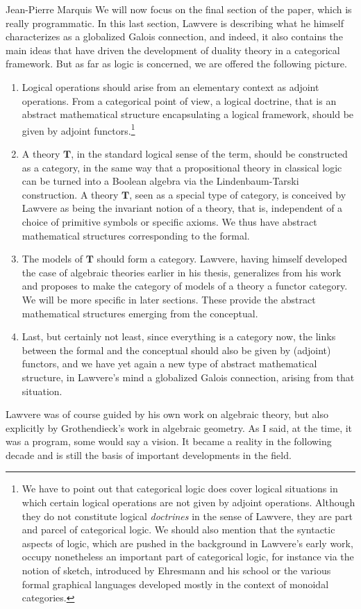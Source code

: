 \begin{artengenv}{Jean-Pierre Marquis}
We will now focus on the final section of the paper, which is really programmatic. In this last section, Lawvere is describing what he himself characterizes as a globalized Galois connection, and indeed, it also contains the main ideas that have driven the development of duality theory in a categorical framework. But as far as logic is concerned, we are offered the following picture.
\begin{enumerate}
	\item Logical operations should arise from an elementary context as adjoint operations. From a categorical point of view, a logical doctrine, that is an abstract mathematical structure encapsulating a logical framework, should be given by adjoint functors.\footnote{We have to point out that categorical logic does cover logical situations in which certain logical operations are not given by adjoint operations. Although they do not constitute logical \emph{doctrines} in the sense of Lawvere, they are part and parcel of categorical logic. We should also mention that the syntactic aspects of logic, which are pushed in the background in Lawvere's early work, occupy nonetheless an important part of categorical logic, for instance via the notion of sketch, introduced by Ehresmann and his school or the various formal graphical languages developed mostly in the context of monoidal categories.}
	\item A theory $\mathbf{T}$, in the standard logical sense of the term, should be constructed as a category, in the same way that a propositional theory in classical logic can be turned into a Boolean algebra via the Lindenbaum-Tarski construction. A theory $\mathbf{T}$, seen as a special type of category, is conceived by Lawvere as being the invariant notion of a theory, that is, independent of a choice of primitive symbols or specific axioms. We thus have abstract mathematical structures corresponding to the formal.
	\item The models of $\mathbf{T}$ should form a category. Lawvere, having himself developed the case of algebraic theories earlier in his thesis, generalizes from his work and proposes to make the category of models of a theory a functor category. We will be more specific in later sections. These provide the abstract mathematical structures emerging from the conceptual.
	\item Last, but certainly not least, since everything is a category now, the links between the formal and the conceptual should also be given by (adjoint) functors, and we have yet again a new type of abstract mathematical structure, in Lawvere's mind a globalized Galois connection, arising from that situation.
\end{enumerate}
Lawvere was of course guided by his own work on algebraic theory, but also explicitly by Grothendieck's work in algebraic geometry. As I said, at the time, it was a program, some would say a vision. It became a reality in the following decade and is still the basis of important developments in the field. 


\end{artengenv}
